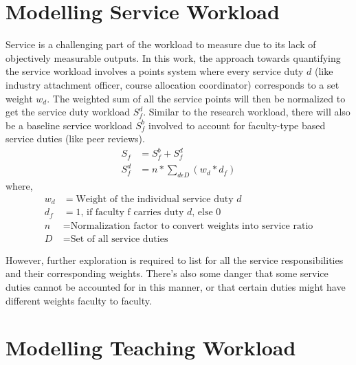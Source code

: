\section{Modelling Service Workload}
Service is a challenging part of the workload to measure due to its lack of objectively measurable outputs. In this work, the approach towards quantifying the service workload involves a points system where every service duty \(d\) (like industry attachment officer, course allocation coordinator) corresponds to a set weight \(w_d\). The weighted sum of all the service points will then be normalized to get the service duty workload \(S^d_f\). Similar to the research workload, there will also be a baseline service workload \(S^b_f\) involved to account for faculty-type based service duties (like peer reviews).
\begin{equation}
    \begin{aligned}
        S_f   & = S^b_f + S^d_f                      \\
        S^d_f & = n *\sum_{d\epsilon D}  (w_d * d_f)
    \end{aligned}
\end{equation}
where,
\begin{equation}
    \nonumber
    \begin{aligned}
        w_d & = \text{Weight of the individual service duty }d                    \\
        d_f & = 1\text{, if faculty f carries duty }d\text{, else }0              \\
        n   & = \text{Normalization factor to convert weights into service ratio} \\
        D   & = \text{Set of all service duties}
    \end{aligned}
\end{equation}


However, further exploration is required to list for all the service responsibilities and their corresponding weights. There's also some danger that some service duties cannot be accounted for in this manner, or that certain duties might have different weights faculty to faculty.

\section{Modelling Teaching Workload}
\label{teaching_workload}

